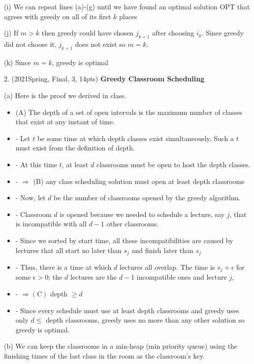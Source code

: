 \begin{spacing}{1.3}
    (i) We can repeat lines (a)-(g) until we have found an optimal solution OPT that agrees with greedy on all of its first $k$ places
    
    (j) If $m>k$ then greedy could have chosen $j_{k+1}$ after choosing $i_{k}$. Since greedy did not choose it, $j_{k+1}$ does not exist so $m=k$.
    
    (k) Since $m=k$, greedy is optimal

    \setlength{\parindent}{0em}

    \vspace{0.5in}
    2. (2021Spring, Final, 3, 14pts) {\bf Greedy Classroom Scheduling} 

    (a) Here is the proof we derived in class.
    \begin{itemize}
        \item (A) The depth of a set of open intervals is the maximum number of classes that exist at any instant of time.
        \item  - Let $t$ be some time at which depth classes exist simultaneously. Such a $t$ must exist from the definition of depth.
        \item  - At this time $t$, at least $d$ classrooms must be open to host the depth classes.
        \item  - $\Rightarrow$ (B) any class scheduling solution must open at least depth classrooms
        \item - Now, let $d$ be the number of classrooms opened by the greedy algorithm.
        \item - Classroom $d$ is opened because we needed to schedule a lecture, say $j$, that is incompatible with all $d-1$ other classrooms.
        \item - Since we sorted by start time, all these incompatibilities are caused by lectures that all start no later than $s_{j}$ and finish later than $s_{j}$
        \item - Thus, there is a time at which $d$ lectures all overlap. The time is $s_{j}+\epsilon$ for some $\epsilon>0$; the $d$ lectures are the $d-1$ incompatible ones and lecture $j$,
        \item - $\Rightarrow(\mathrm{C})$ depth $\geq d$
        \item - Since every schedule must use at least depth classrooms and greedy uses only $d \leq$ depth classrooms, greedy uses no more than any other solution so greedy is optimal.
    \end{itemize}

    (b) We can keep the classrooms in a min-heap (min priority queue) using the finishing times of the last class in the room as the classroom's key.
    

\end{spacing}
